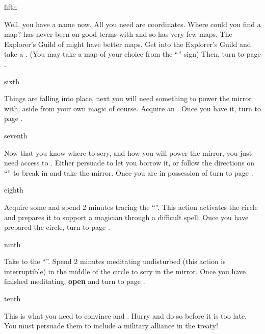 \documentclass[greennotebook]{NeptuneBall}
\begin{document}
\begin{page}{fifth}

Well, you have a name now. All you need are coordinates. Where could you find a map? \pPacifica{} has never been on good terms with \pIndia{} and so has very few maps. The Explorer's Guild of \pAtlantis{} might have better maps. Get into the Explorer's Guild and take a \iMapOfIndia{}. (You may take a map of your choice from the ``\sPileOfMaps{}'' sign) Then, turn to page .

\end{page}

\begin{page}{sixth}

Things are falling into place, next you will need something to power the mirror with, aside from your own magic of course. Acquire an \iElectricEel{}. Once you have it, turn to page .

\end{page}

\begin{page}{seventh}

Now that you know where to scry, and how you will power the mirror, you just need access to \iScryingMirror{}. Either persuade \cKing{\King} \cKing{} to let you borrow it, or follow the directions on ``\sArtifactThree{}'' to break in and take the mirror. Once you are in possession of \iScryingMirror{} turn to page .

\end{page}

\begin{page}{eighth}

Acquire some \iChalk{} and spend 2 minutes tracing the ``\sRunicCircle{}''. This action activates the circle and prepares it to support a magician through a difficult spell. Once you have prepared the circle, turn to page .

\end{page}

\begin{page}{ninth}

Take \iScryingMirror{} to the ``\sRunicCircle{}''. Spend 2 minutes meditating undisturbed (this action is interruptible) in the middle of the circle to scry in the mirror. Once you have finished meditating, {\bf open \iScryingMirror{}} and turn to page .

\end{page}

\begin{page}{tenth}

This is what you need to convince \cKing{} and \cPrince{}. Hurry and do so before it is too late. You must persuade them to include a military alliance in the treaty!

\end{page}


\endnotebook
\end{document}
